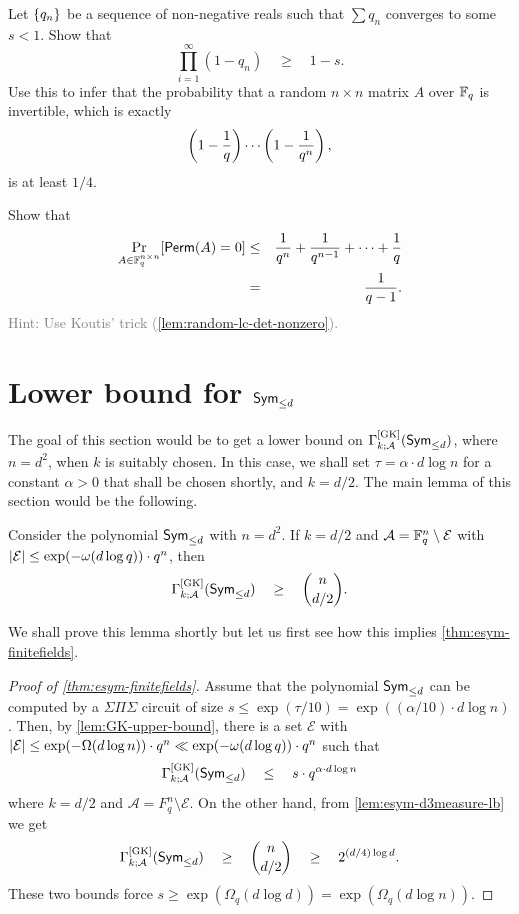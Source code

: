 \begin{exercise}
  Let $\left\{q_n\right\}$ be a sequence of non-negative reals such that $\sum q_n$ converges to some $s < 1$. 
Show that 
  \[
  \prod_{i=1}^{\infty} (1 - q_n) \quad \geq \quad 1 - s. 
  \]
  Use this to infer that the probability that a random $n\times n$ matrix $A$ over $\mathbb{F}_q$ is invertible, which is exactly
  \[
  \left(1 - \frac{1}{q}\right)\cdots \left(1 - \frac{1}{q^{n}}\right),
  \]
  is at least $1/4$. 
\end{exercise}

\begin{exercise}
  Show that
  \begin{eqnarray*}
    \Pr_{A \in \mathbb{F}_q^{n\times n}}[\operatorname{\mathsf{Perm}}(A) = 0] & \leq &  \frac{1}{q^n} + \frac{1}{q^{n-1}} + \cdots + \frac{1}{q}\\
    & = & \frac{1}{q-1}.
  \end{eqnarray*}
  \textcolor{gray}{Hint: Use Koutis' trick (\autoref{lem:random-lc-det-nonzero}).}
\end{exercise}

\section{Lower bound for $\operatorname{\mathsf{Sym}}_{\leq d}$}

The goal of this section would be to get a lower bound on $\Gamma^{\mathrm{[GK]}}_{k;\mathcal{A}}(\operatorname{\mathsf{Sym}}_{\leq d})$, where $n = d^2$, when $k$ is suitably chosen. In this case, we shall set $\tau = \alpha \cdot d \log n$ for a constant $\alpha>0$ that shall be chosen shortly, and $k = d/2$. The main lemma of this section would be the following. 

\begin{lemma}\label{lem:esym-d3measure-lb}
Consider the polynomial $\operatorname{\mathsf{Sym}}_{\leq d}$ with $n = d^2$. If $k = d/2$ and $\mathcal{A} = \mathbb{F}_q^n \setminus \mathcal{E}$ with $\left|\mathcal{E}\right| \leq \exp(-\omega(d\log q)) \cdot  q^n$, then
\[
\Gamma^{\mathrm{[GK]}}_{k;\mathcal{A}}(\operatorname{\mathsf{Sym}}_{\leq d}) \quad \geq \quad \binom{n}{d/2}.
\]
\end{lemma}

\noindent
We shall prove this lemma shortly but let us first see how this implies \autoref{thm:esym-finitefields}. 

\begin{proof}[Proof of \autoref{thm:esym-finitefields}]
Assume that the polynomial $\operatorname{\mathsf{Sym}}_{\leq d}$ can be computed by a $\Sigma\Pi\Sigma$ circuit of size $s \leq \exp(\tau/10) = \exp((\alpha/10) \cdot d \log n)$. Then, by \autoref{lem:GK-upper-bound}, there is a set $\mathcal{E}$ with $\left|\mathcal{E}\right| \leq \exp(-\Omega(d\log n)) \cdot q^n \ll \exp(-\omega(d \log q)) \cdot q^n$ such that
\[
\Gamma^{\mathrm{[GK]}}_{k;\mathcal{A}}(\operatorname{\mathsf{Sym}}_{\leq d}) \quad \leq \quad s \cdot q^{\alpha\cdot d\log n}
\]
where $k = d/2$ and $\mathcal{A} = F_q^n \setminus \mathcal{E}$. On the other hand, from \autoref{lem:esym-d3measure-lb} we get
\[
\Gamma^{\mathrm{[GK]}}_{k;\mathcal{A}}(\operatorname{\mathsf{Sym}}_{\leq d}) \quad \geq \quad \binom{n}{d/2} \quad \geq \quad 2^{(d/4) \log d}.
\]
These two bounds force $s \geq \exp(\Omega_q(d \log d)) = \exp(\Omega_q(d\log n))$. 
\end{proof}

